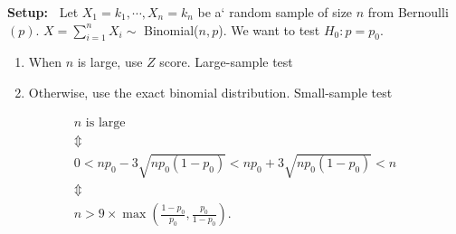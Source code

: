 \begin{frame}

{\bf Setup:~} Let $X_1=k_1,\cdots,X_n=k_n$ be a` random sample of size $n$ from Bernoulli$(p)$.
$X=\sum_{i=1}^n X_i\sim$ Binomial($n,p$).
We want to test $H_0: p=p_0$.
\pause\vfill
\begin{enumerate}
 \item When $n$ is large, use $Z$ score.  \hfill Large-sample test
 \item Otherwise, use the exact binomial distribution. \hfill Small-sample test
\end{enumerate}
\vfill\pause
\begin{gather*}
\text{$n$ is large}\\
\Updownarrow \\
 0 < np_0 -3\sqrt{np_0(1-p_0)}< np_0 +3\sqrt{np_0(1-p_0)}<n\\
 \Updownarrow \\
 n> 9 \times \max\left(\frac{1-p_0}{p_0},\frac{p_0}{1-p_0}\right).
\end{gather*}
\end{frame}
